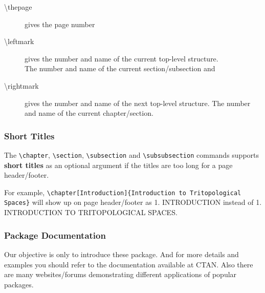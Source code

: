 \documentclass{article}
\begin{document}
\begin{description}
	\item[\textbackslash thepage] gives the page number
	\item[\textbackslash leftmark] gives the number and name of the current top-level structure.\\ The number and name of the current section/subsection and
	\item[\textbackslash rightmark] gives the number and name of the next top-level structure. The number and name of the current chapter/section.
\end{description}

\subsubsection{Short Titles}
	The \texttt{\textbackslash chapter}, \texttt{\textbackslash section}, \texttt{\textbackslash subsection} and \texttt{\textbackslash subsubsection} commands supports \textbf{short titles} as an optional argument if the titles are too long for a page header/footer.
	
	For example, \texttt{\textbackslash chapter[Introduction]\{Introduction to Tritopological Spaces\}} will show up on page header/footer as 1. INTRODUCTION instead of 1. INTRODUCTION TO TRITOPOLOGICAL SPACES.

\subsubsection{Package Documentation}
	Our objective is only to introduce these package. And for more details and examples you should refer to the documentation available at CTAN. Also there are many websites/forums demonstrating different applications of popular packages.
\end{document}
